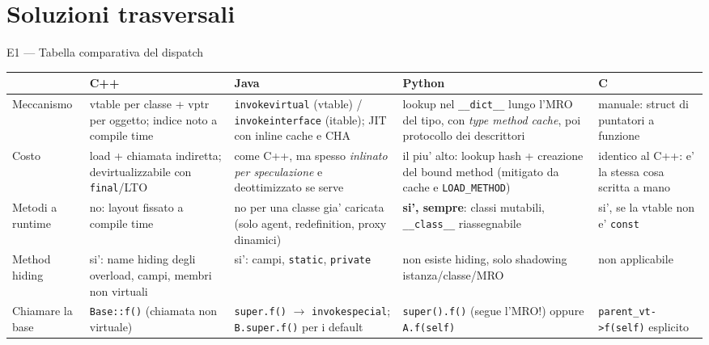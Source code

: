\documentclass{report}
\newcommand{\code}[1]{\texttt{\small #1}}
\newcommand{\dunder}[1]{\texttt{\small \_\_#1\_\_}}
\begin{document}
\section{Soluzioni trasversali}

\begin{soluzione}{E1 --- Tabella comparativa del dispatch}
\label{sol:E1}
\begin{center}
\renewcommand{\arraystretch}{1.3}
\setlength{\tabcolsep}{4pt}
\scriptsize
\begin{tabular}{|>{\raggedright\arraybackslash}p{1.8cm}|>{\raggedright\arraybackslash}p{3.1cm}|>{\raggedright\arraybackslash}p{3.1cm}|>{\raggedright\arraybackslash}p{3.1cm}|>{\raggedright\arraybackslash}p{3.1cm}|}
\hline
& \textbf{C++} & \textbf{Java} & \textbf{Python} & \textbf{C} \\
\hline
Meccanismo &
vtable per classe + vptr per oggetto; indice noto a compile time &
\code{invokevirtual} (vtable) / \code{invokeinterface} (itable); JIT con inline cache e CHA &
lookup nel \code{\_\_dict\_\_} lungo l'MRO del tipo, con \emph{type method cache}, poi protocollo dei descrittori &
manuale: struct di puntatori a funzione \\
\hline
Costo &
2 load + chiamata indiretta; devirtualizzabile con \code{final}/LTO &
come C++, ma spesso \emph{inlinato per speculazione} e deottimizzato se serve &
il piu' alto: lookup hash + creazione del bound method (mitigato da cache e \code{LOAD\_METHOD}) &
identico al C++: e' la stessa cosa scritta a mano \\
\hline
Metodi a runtime &
no: layout fissato a compile time &
no per una classe gia' caricata (solo agent, redefinition, proxy dinamici) &
\textbf{si', sempre}: classi mutabili, \dunder{class} riassegnabile &
si', se la vtable non e' \code{const} \\
\hline
Method hiding &
si': name hiding degli overload, campi, membri non virtuali &
si': campi, \code{static}, \code{private} &
non esiste hiding, solo shadowing istanza/classe/MRO &
non applicabile \\
\hline
Chiamare la base &
\code{Base::f()} (chiamata non virtuale) &
\code{super.f()} $\rightarrow$ \code{invokespecial}; \code{B.super.f()} per i default &
\code{super().f()} (segue l'MRO!) oppure \code{A.f(self)} &
\code{parent\_vt->f(self)} esplicito \\
\hline
\end{tabular}
\end{center}
\end{soluzione}
\end{document}
